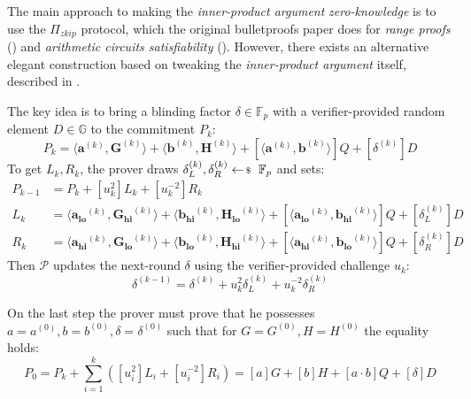 \documentclass[../lecture-notes-148x210.tex]{subfiles}
\begin{document}
The main approach to making the \textit{inner-product argument} \textit{zero-knowledge} is to use the $\Pi_{zkip}$ protocol, which the original bulletproofs paper \cite{bulletproofs} does for \textit{range proofs} () and \textit{arithmetic circuits satisfiability} (). However, there exists an alternative elegant construction based on tweaking the \textit{inner-product argument} itself, described in \cite[Appendix E.2]{pvss}.

The key idea is to bring a blinding factor $\delta \in \mathbb{F}_p$ with a verifier-provided random element $D \in \mathbb{G}$ to the commitment $P_k$:
$$ P_k = \langle \mathbf{a}^{(k)}, \mathbf{G}^{(k)} \rangle + \langle \mathbf{b}^{(k)}, \mathbf{H}^{(k)} \rangle + [\langle \mathbf{a}^{(k)}, \mathbf{b}^{(k)} \rangle]Q + [\delta^{(k)}]D $$
To get $L_k, R_k$, the prover draws $\delta^{(k)}_L, \delta^{(k)}_R \leftarrowS \mathbb{F}_p$ and sets:
\begin{align*}
    P_{k-1} &= P_k + [u_k^2] L_k + [u_k^{-2}] R_k \\
    L_{k} &= \langle \mathbf{a_{lo}}^{(k)}, \mathbf{G_{hi}}^{(k)}\rangle + \langle \mathbf{b_{hi}}^{(k)}, \mathbf{H_{lo}}^{(k)}\rangle + [\langle \mathbf{a_{lo}}^{(k)}, \mathbf{b_{hi}}^{(k)}\rangle]Q + [\delta^{(k)}_L]D \\
    R_{k} &= \langle \mathbf{a_{hi}}^{(k)}, \mathbf{G_{lo}}^{(k)}\rangle + \langle \mathbf{b_{lo}}^{(k)}, \mathbf{H_{hi}}^{(k)}\rangle + [\langle \mathbf{a_{hi}}^{(k)}, \mathbf{b_{lo}}^{(k)}\rangle]Q + [\delta^{(k)}_R]D
\end{align*}
Then $\mathcal{P}$ updates the next-round $\delta$ using the verifier-provided challenge $u_k$:
$$\delta^{(k-1)} = \delta^{(k)} + u_k^2\delta^{(k)}_L + u_k^{-2}\delta^{(k)}_R$$

On the last step the prover must prove that he possesses $a = a^{(0)}, b = b^{(0)}, \delta = \delta^{(0)}$ such that for $G = G^{(0)}, H = H^{(0)}$ the equality holds:
\begin{equation*}
    P_0 = P_k + \sum_{i=1}^k ([u_i^2]L_i + [u_i^{-2}]R_i) = [a]G + [b]H + [a\cdot b]Q + [\delta]D
\end{equation*}
\end{document}
